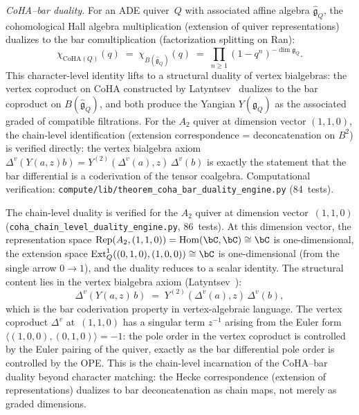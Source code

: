 \begin{remark}
\emph{CoHA--bar duality.}
For an ADE quiver~$Q$ with associated affine algebra
$\widehat{\mathfrak{g}}_Q$, the cohomological Hall
algebra multiplication (extension of quiver
representations) dualizes to the bar comultiplication
(factorization splitting on Ran):
\begin{equation}\label{eq:coha-bar-character-duality}
 \chi_{\mathrm{CoHA}(Q)}(q)
 \;=\;
 \chi_{B(\widehat{\mathfrak{g}}_Q)}(q)
 \;=\;
 \prod_{n \geq 1}(1 - q^n)^{-\dim \mathfrak{g}_Q}.
\end{equation}
This character-level identity lifts to a structural duality
of vertex bialgebras: the vertex coproduct on CoHA
constructed by Latyntsev~\cite{Latyntsev23} dualizes to the
bar coproduct on $B(\widehat{\mathfrak{g}}_Q)$, and both
produce the Yangian $Y(\mathfrak{g}_Q)$ as the associated
graded of compatible filtrations. For the $A_2$ quiver at
dimension vector $(1,1,0)$, the chain-level identification
(extension correspondence = deconcatenation on $B^2$)
is verified directly: the vertex bialgebra axiom
$\Delta^v(Y(a,z)b) = Y^{(2)}(\Delta^v(a),z)\,\Delta^v(b)$
is exactly the statement that the bar differential is a
coderivation of the tensor coalgebra.
Computational verification:
\texttt{compute/lib/theorem\_coha\_bar\_duality\_engine.py}
(84~tests).

The chain-level duality is verified for the $A_2$ quiver at
dimension vector~$(1,1,0)$
(\texttt{coha\_chain\_level\_duality\_engine.py}, 86~tests).
At this dimension vector, the representation space
$\operatorname{Rep}(A_2, (1,1,0)) = \operatorname{Hom}(\bC, \bC)
\cong \bC$ is one-dimensional, the extension space
$\operatorname{Ext}^1_Q((0,1,0),(1,0,0)) \cong \bC$ is
one-dimensional (from the single arrow $0 \to 1$), and the
duality reduces to a scalar identity. The structural content
lies in the vertex bialgebra axiom
(Latyntsev~\cite{Latyntsev23}):
\begin{equation}\label{eq:v1-jkl-vertex-bialgebra-ht}
 \Delta^v(Y(a,z)\,b)
 \;=\;
 Y^{(2)}(\Delta^v(a),z)\,\Delta^v(b),
\end{equation}
which is the bar coderivation property in vertex-algebraic
language. The vertex coproduct $\Delta^v$ at~$(1,1,0)$ has a
singular term $z^{-1}$ arising from the Euler form
$\langle (1,0,0), (0,1,0) \rangle = -1$: the pole order in
the vertex coproduct is controlled by the
Euler pairing of the quiver, exactly as the bar differential
pole order is controlled by the OPE. This is the
chain-level incarnation of the CoHA--bar duality beyond
character matching: the Hecke correspondence
(extension of representations) dualizes to bar deconcatenation
as chain maps, not merely as graded dimensions.


\end{remark}
